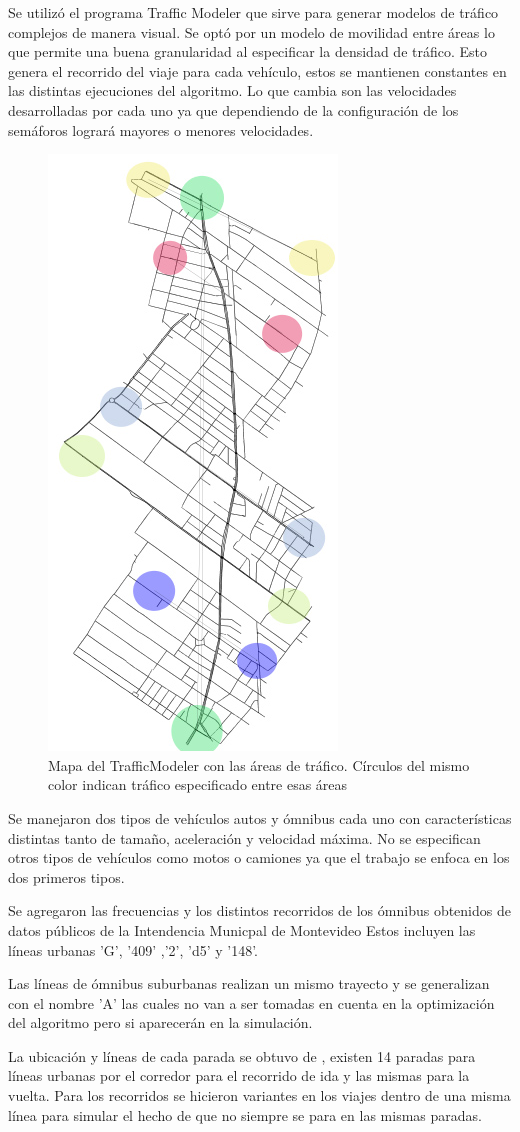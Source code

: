 Se utilizó el programa Traffic Modeler \citep{TrafficModeler} que sirve para generar modelos de tráfico complejos de manera visual. Se optó por un modelo de movilidad entre áreas lo que permite una buena granularidad al especificar la densidad de tráfico. Esto genera el recorrido del viaje para cada vehículo, estos se mantienen constantes en las distintas ejecuciones del algoritmo. Lo que cambia son las velocidades desarrolladas por cada uno ya que dependiendo de la configuración de los semáforos logrará mayores o menores velocidades.



\begin{figure}[h]
	\centering
	\includegraphics[width=0.3\linewidth]{Figures/areaflow1}
	\caption{Mapa del TrafficModeler con las áreas de tráfico. Círculos del mismo color indican tráfico especificado entre esas áreas}
	\label{fig:areaflow1}
\end{figure}


Se manejaron dos tipos de vehículos autos y ómnibus cada uno con características distintas tanto de tamaño, aceleración y velocidad máxima. No se especifican otros tipos de vehículos como motos o camiones ya que el trabajo se enfoca en los dos primeros tipos.

Se agregaron las frecuencias y los distintos recorridos de los ómnibus obtenidos de datos públicos de la Intendencia Municpal de Montevideo \citep{IMM}
Estos incluyen las líneas urbanas  'G', '409' ,'2', 'd5'  y  '148'. 

Las líneas de ómnibus suburbanas realizan  un mismo  trayecto y se generalizan con el nombre 'A' las cuales no van a ser tomadas en cuenta en la optimización del algoritmo pero si aparecerán en la simulación.

La ubicación y líneas de cada parada se obtuvo de \citep{sigMontevideo}, existen 14 paradas para líneas urbanas por el corredor para el recorrido de ida y las mismas para la vuelta.
Para los recorridos se hicieron  variantes  en  los  viajes  dentro  de  una  misma línea para simular el hecho de que no siempre se para en las mismas paradas.

